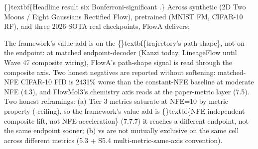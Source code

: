 \documentclass{article}
\begin{document}
\{\}textbf\{Headline result  six Bonferroni-significant .\} Across synthetic (2D Two Moons / Eight Gaussians Rectified Flow), pretrained (MNIST FM, CIFAR-10 RF), and three 2026 SOTA real checkpoints, FlowA delivers:

\begin{table}[ht]
\centering
\small
{}%
\end{table}

The framework's value-add is on the \{\}textbf\{trajectory's path-shape\}, not on the endpoint: at matched endpoint-decoder (Kanzi today, LineageFlow until Wave 47 composite wiring), FlowA's path-shape signal is read through the composite axis. Two honest negatives are reported without softening: matched-NFE CIFAR-10 FID is 2431\% worse than the constant-NFE baseline at moderate NFE (4.3), and FlowMol3's chemistry axis reads  at the paper-metric layer (7.5). Two honest reframings: (a) Tier 3 metrics saturate at NFE=10 by metric property ( ceiling), so the framework's value-add is \{\}textbf\{NFE-independent composite lift, not NFE-acceleration\} (7.7.7)  it reaches a different endpoint, not the same endpoint sooner; (b)  vs  are not mutually exclusive on the same cell across different metrics (5.3 + S5.4 multi-metric-same-axis convention).
\end{document}
